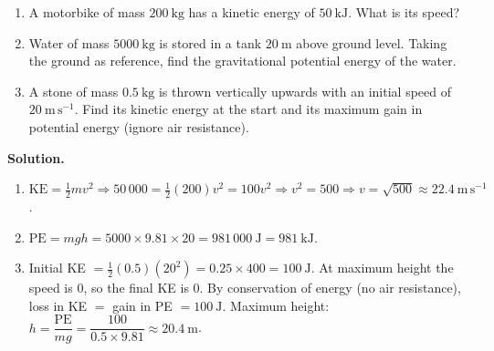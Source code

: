 \documentclass[11pt]{article}
\begin{document}
\begin{exemplebox}
\begin{enumerate}
\item A motorbike of mass $200\ \mathrm{kg}$ has a kinetic energy of $50\ \mathrm{kJ}$. What is its speed?
\item Water of mass $5000\ \mathrm{kg}$ is stored in a tank $20\ \mathrm{m}$ above ground level. Taking the ground as reference, find the gravitational potential energy of the water.
\item A stone of mass $0.5\ \mathrm{kg}$ is thrown vertically upwards with an initial speed of $20\ \mathrm{m\,s^{-1}}$. Find its kinetic energy at the start and its maximum gain in potential energy (ignore air resistance).
\end{enumerate}

\tcblower
\textbf{Solution.}
\begin{enumerate}
\item $\mathrm{KE} = \frac{1}{2}mv^2 \Rightarrow 50\,000 = \frac{1}{2}(200)v^2 = 100v^2 \Rightarrow v^2 = 500 \Rightarrow v = \sqrt{500} \approx 22.4\ \mathrm{m\,s^{-1}}$.
\item $\mathrm{PE} = mgh = 5000 \times 9.81 \times 20 = 981\,000\ \mathrm{J} = 981\ \mathrm{kJ}$.
\item Initial KE $= \frac{1}{2}(0.5)(20^2) = 0.25 \times 400 = 100\ \mathrm{J}$. At maximum height the speed is $0$, so the final KE is $0$. By conservation of energy (no air resistance), loss in KE $=$ gain in PE $= 100\ \mathrm{J}$. Maximum height: $h = \dfrac{\mathrm{PE}}{mg} = \dfrac{100}{0.5 \times 9.81} \approx 20.4\ \mathrm{m}$.
\end{enumerate}
\end{exemplebox}
\end{document}
